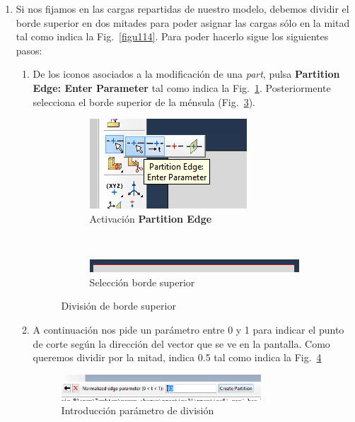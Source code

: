 \begin{enumerate}
\item Si nos fijamos en las cargas repartidas de nuestro modelo,
  debemos dividir el borde superior en dos mitades para poder asignar
  las cargas sólo en la mitad tal como indica la
  Fig.~\ref{figu114}. Para poder hacerlo sigue los siguientes pasos:
  \begin{enumerate}
  \item De los iconos asociados a la modificación de una
    \textit{part}, pulsa \textbf{Partition Edge: Enter Parameter} tal
    como indica la Fig.~\ref{figu34}. Posteriormente selecciona el
    borde superior de la ménsula (Fig.~\ref{figu35}).
    \begin{figure}[H]
      \centering
      \begin{subfigure}{0.29\textwidth}
        \includegraphics[width=\textwidth]{./body/images/imagen34}
        \caption{Activación \textbf{Partition Edge}}
        \label{figu34}
      \end{subfigure}%
      ~ %
      \begin{subfigure}{0.59\textwidth}
        \includegraphics[width=\textwidth]{./body/images/imagen35}
        \caption{Selección borde superior}
        \label{figu35}
      \end{subfigure}%
      \caption{División de borde superior}
    \end{figure}
  \item A continuación nos pide un parámetro entre 0 y 1 para indicar
    el punto de corte según la dirección del vector que se ve en la
    pantalla. Como queremos dividir por la mitad, indica 0.5 tal como
    indica la Fig.~\ref{figu36}
    \begin{figure}[H]
      \begin{center}
        \includegraphics[width=0.75\textwidth]{./body/images/imagen36}
      \end{center}
      \caption{Introducción parámetro de división}
      \label{figu36}
    \end{figure}
  \end{enumerate}
\end{enumerate}
